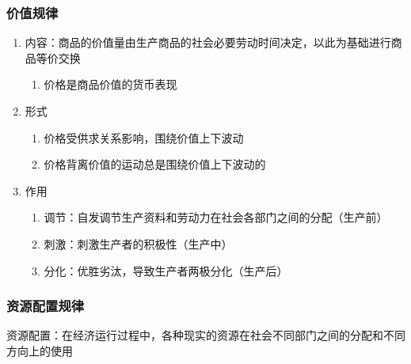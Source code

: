 \documentclass[12pt]{book}
\begin{document}
\subsubsection{价值规律}


\begin{enumerate}
    \item 内容：商品的价值量由生产商品的社会必要劳动时间决定，以此为基础进行商品等价交换
          \begin{enumerate}[(1)]
              \item 价格是商品价值的货币表现
          \end{enumerate}
    \item 形式
          \begin{enumerate}[(1)]
              \item 价格受供求关系影响，围绕价值上下波动
              \item 价格背离价值的运动总是围绕价值上下波动的
          \end{enumerate}
    \item 作用
          \begin{enumerate}[(1)]
              \item 调节：自发调节生产资料和劳动力在社会各部门之间的分配（生产前）
              \item 刺激：刺激生产者的积极性（生产中）
              \item 分化：优胜劣汰，导致生产者两极分化（生产后）
          \end{enumerate}
\end{enumerate}








\subsubsection{资源配置规律}



资源配置：在经济运行过程中，各种现实的资源在社会不同部门之间的分配和不同方向上的使用
\\
\end{document}
